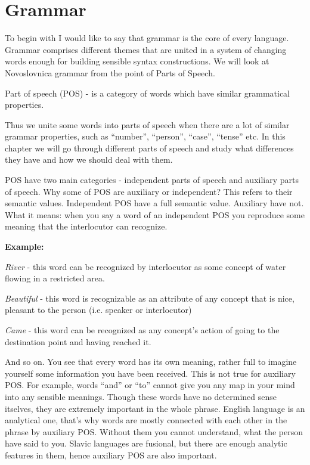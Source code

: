 \chapter{Grammar}

To begin with I would like to say that grammar is the core of every language. Grammar comprises different themes that are united in a system of changing words enough for building sensible syntax constructions. We will look at Novoslovnica grammar from the point of Parts of Speech.

Part of speech (POS) - is a category of words which have similar grammatical properties.

Thus we unite some words into parts of speech when there are a lot of similar grammar properties, such as “number”, “person”, “case”, “tense” etc. In this chapter we will go through different parts of speech and study what differences they have and how we should deal with them. 

POS have two main categories - independent parts of speech and auxiliary parts of speech. Why some of POS are auxiliary or independent? This refers to their semantic values. Independent POS have a full semantic value. Auxiliary have not. What it means: when you say a word of an independent POS you reproduce some meaning that the interlocutor can recognize.

\textbf{Example:}

\textit{River} - this word can be recognized by interlocutor as some concept of water flowing in a restricted area.

\textit{Beautiful} - this word is recognizable as an attribute of any concept that is nice, pleasant to the person (i.e. speaker or interlocutor)

\textit{Came} - this word can be recognized as any concept’s action of going to the destination point and having reached it. 

And so on. You see that every word has its own meaning, rather full to imagine yourself some information you have been received. This is not true for auxiliary POS. For example, words “and” or “to” cannot give you any map in your mind into any sensible meanings. Though these words have no determined sense itselves, they are extremely important in the whole phrase. English language is an analytical one, that’s why words are mostly connected with each other in the phrase by auxiliary POS. Without them you cannot understand, what the person have said to you. Slavic languages are fusional, but there are enough analytic features in them, hence auxiliary POS are also important.

